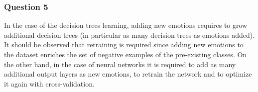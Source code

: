 \documentclass{article}
\begin{document}
\subsubsection*{Question 5}
In the case of the decision trees learning, adding new emotions requires to grow additional decision trees (in particular as many decision trees as emotions added). It should be observed that retraining is required since adding new emotions to the dataset enriches the set of negative examples of the pre-existing classes. On the other hand, in the case of neural networks it is required to add as many additional output layers as new emotions, to retrain the network and to optimize it again with cross-validation.

%
%
\end{document}
